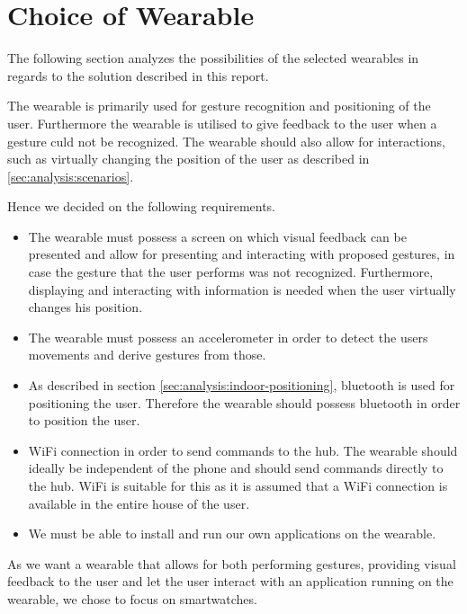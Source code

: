 \section{Choice of Wearable}
\label{sec:analysis:choice-of-wearables}

The following section analyzes the possibilities of the selected wearables in regards to the solution described in this report.

The wearable is primarily used for gesture recognition and positioning of the user. Furthermore the wearable is utilised to give feedback to the user when a gesture culd not be recognized. The wearable should also allow for interactions, such as virtually changing the position of the user as described in \cref{sec:analysis:scenarios}.

Hence we decided on the following requirements.

\begin{itemize}
\item The wearable must possess a screen on which visual feedback can be presented and allow for presenting and interacting with proposed gestures, in case the gesture that the user performs was not recognized. Furthermore, displaying and interacting with information is needed when the user virtually changes his position.
\item The wearable must possess an accelerometer in order to detect the users movements and derive gestures from those.
\item As described in section \cref{sec:analysis:indoor-positioning}, bluetooth is used for positioning the user. Therefore the wearable should possess bluetooth in order to position the user.
\item WiFi connection in order to send commands to the hub. The wearable should ideally be independent of the phone and should send commands directly to the hub. WiFi is suitable for this as it is assumed that a WiFi connection is available in the entire house of the user. \author[author=Simon]{Argument why we use a hub that uses WiFi. Reference to section on choice of hub.}
\item We must be able to install and run our own applications on the wearable.
\end{itemize}

As we want a wearable that allows for both performing gestures, providing visual feedback to the user and let the user interact with an application running on the wearable, we chose to focus on smartwatches.

